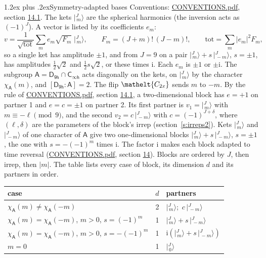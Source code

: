 \documentclass[10pt,a4paper]{article}
\makeatletter
\renewcommand\section{\@startsection{section}{1}{\z@}{-3ex plus -1ex minus -.2ex}%
  {1.2ex plus .2ex}{\normalfont\large\sffamily\bfseries\color{parttitle}}}
\numberwithin{equation}{section}
\newcommand{\eltfont}[1]{{\let\sigma\eltsigma\mathelt{#1}}}
\newcommand{\grp}[1]{\mathsf{#1}}
\newcommand{\elt}[1]{\eltfont{#1}}
\newcommand{\grpindex}[2]{[#1 : #2]}
\newcommand{\iunit}{\mathrm{i}}
\newcommand{\chiA}{\chi_{\grp{A}}}
\newcommand{\jm}[2]{\bigl\lvert{}^{#1}_{\,#2}\bigr\rangle}
\makeatother
\begin{document}
\section{Symmetry-adapted bases}\label{s:bases}
Conventions: \href{../../CONVENTIONS.pdf}{CONVENTIONS.pdf}, section \href{../../CONVENTIONS.pdf\#conv.14.1}{14.1}.
\leavevmode\label{n:index.m}\label{n:vector.ket}The kets $\jm{J}{m}$ are the spherical harmonics (the inversion acts as $(-1)^J$). \label{n:index.ketcoefficient}\label{n:vector.basis.symmetry}\label{n:index.ketweight}\label{n:index.total}A vector is listed by its coefficients $e_m$:
\begin{equation}\label{e:ket}v = \frac{1}{\sqrt{\mathrm{tot}}}\sum_m e_m\sqrt{F_m}\;\jm{J}{m},\qquad F_m = (J+m)!\,(J-m)!,\qquad \mathrm{tot} = \sum_m |e_m|^2F_m,\end{equation}
\leavevmode\label{n:index.pair.sign}so a single ket has amplitude $\pm1$, and from $J = 9$ on a pair $\jm{J}{m} + s\,\jm{J}{-m}$, $s = \pm1$, has amplitudes $\tfrac{1}{2}\sqrt{2}$ and $\tfrac{1}{2}s\sqrt{2}$, or these times $\iunit$. Each $e_m$ is $\pm1$ or $\pm\iunit$.
\leavevmode\label{n:group.A}\label{n:function.character.abelian}The subgroup $\grp{A} = \grp{D_{9h}}\cap\grp{C_{\infty h}}$ acts diagonally on the kets, on $\jm{J}{m}$ by the character $\chiA(m)$, and $\grpindex{\grp{D_{9h}}}{\grp{A}} = 2$. The flip $\elt{C_{2x}}$ sends $m$ to $-m$. \label{n:index.partner.sign}By the rule of \href{../../CONVENTIONS.pdf}{CONVENTIONS.pdf}, section \href{../../CONVENTIONS.pdf\#conv.14.1}{14.1}, a two-dimensional block has $e = +1$ on partner 1 and $e = c = \pm1$ on partner 2. Its first partner is $v_1 = \jm{J}{m}$ with $m \equiv -\ell \pmod{9}$, and the second $v_2 = c\,\jm{J}{-m}$ with $c = (-1)^{J+\delta}$, where $(\ell, \delta)$ are the parameters of the block's irrep (section~\ref{s:irreps2}). Kets $\jm{J}{m}$ and $\jm{J}{-m}$ of one character of $\grp{A}$ give two one-dimensional blocks $\jm{J}{m} + s\,\jm{J}{-m}$, $s = \pm1$, the one with $s = -(-1)^m$ times $\iunit$. The factor $\iunit$ makes each block adapted to time reversal (\href{../../CONVENTIONS.pdf}{CONVENTIONS.pdf}, section \href{../../CONVENTIONS.pdf\#conv.14}{14}). Blocks are ordered by $J$, then irrep, then $|m|$.
\leavevmode\label{n:head.case}\label{n:head.partners}The table lists every case of block, its dimension $d$ and its partners in order.
\begin{center}\begin{tabular}{@{}lrl@{}}\toprule
case & $d$ & partners\\\midrule
$\chiA(m) \ne \chiA(-m)$ & 2 & $\jm{J}{m}$;\ $c\,\jm{J}{-m}$\\
$\chiA(m) = \chiA(-m)$, $m > 0$, $s = (-1)^m$ & 1 & $\jm{J}{m} + s\,\jm{J}{-m}$\\
$\chiA(m) = \chiA(-m)$, $m > 0$, $s = -(-1)^m$ & 1 & $\iunit(\jm{J}{m} + s\,\jm{J}{-m})$\\
$m = 0$ & 1 & $\jm{J}{0}$\\
\bottomrule\end{tabular}\end{center}
\end{document}
